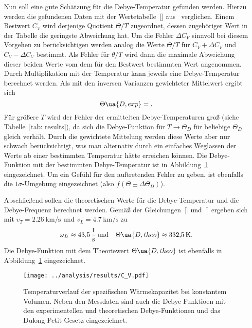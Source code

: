 Nun soll eine gute Schätzung für die Debye-Temperatur gefunden werden. Hierzu werden die gefundenen Daten mit der 
Wertetabelle~\ref{} aus~\cite{anleitungV47} verglichen. Einem Bestwert $C_V$ wird derjenige Quotient $\Theta / T$ zugeordnet, dessen 
zugehöriger Wert in der Tabelle die geringste Abweichung hat. Um die Fehler $\Delta C_V$ sinnvoll bei diesem 
Vorgehen zu berücksichtigen werden analog die Werte $\Theta / T$ für $C_V + \Delta C_V$ und $C_V - \Delta C_V$ bestimmt. 
Als Fehler für $\theta / T$ wird dann die maximale Abweichung dieser beiden Werte vom dem für den Bestwert bestimmten 
Wert angenommen. Durch Multiplikation mit der Temperatur kann jeweils eine Debye-Temperatur berechnet werden. 
Als mit den inversen Varianzen gewichteter Mittelwert ergibt sich
\begin{equation}
        \Theta\ua{D, exp} = .
\end{equation}
Für größere $T$ wird der Fehler der ermittelten Debye-Temperaturen groß (siehe Tabelle~\ref{tab: results}), da sich die Debye-Funktion für 
$T \rightarrow \Theta_D$ für beliebige $\Theta_D$ gleich verhält. Durch die gewichtete Mittelung werden diese Werte aber nur schwach 
berücksichtigt, was man alternativ durch ein einfaches Weglassen der Werte ab einer bestimmten Temperatur hätte erreichen können.
Die Debye-Funktion mit der bestimmten Debye-Temperatur ist in Abbildung~\ref{fig: C_V} eingezeichnet. Um ein Gefühl für den 
auftretenden Fehler zu geben, ist ebenfalls die $1\sigma$-Umgebung eingezeichnet (also $f(\Theta \pm \Delta\Theta_D)$).

Abschließend sollen die theoretischen Werte für die Debye-Temperatur und die Debye-Frequenz berechnet werden.
Gemäß der Gleichungen~\eqref{} und~\eqref{} ergeben sich mit $v_T = \SI{2.26}{\kilo\meter\per\second}$
und $v_L = \SI{4.7}{\kilo\meter\per\second}$ zu 
\begin{equation}
        \omega_D \approx \SI{43.5}{\per\second} \, \text{und} \quad \Theta\ua{D, theo} \approx \SI{332.5}{\kelvin}.
\end{equation}
Die Debye-Funktion mit dem Theoriewert $\Theta\ua{D, theo}$ ist ebenfalls in Abbildung~\ref{fig: C_V} eingezeichnet.

\begin{figure}
\centering
\texttt{[image: ../analysis/results/C\_V.pdf]}
\caption{Temperaturverlauf der spezifischen Wärmekapazitet bei konstantem Volumen. Neben den Messdaten sind auch die 
Debye-Funktioen mit den experimentellen und theoretischen Debye-Funktionen und das Dulong-Petit-Gesetz eingezeichnet.}
\label{fig: C_V}
\end{figure}